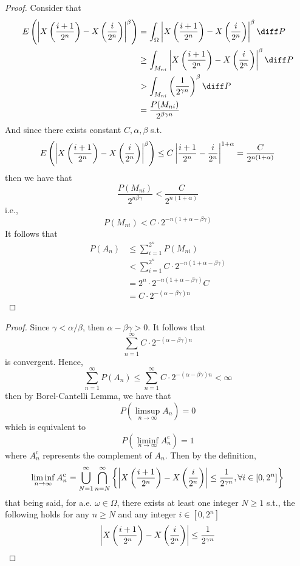 \begin{subproblem}
\begin{proof}
            Consider that
            \[\begin{aligned}
                E\left(\absdelta^\beta\right)&=\int_\Omega\absdelta^\beta\diff P\\
                &\geq\int_{M_{ni}}\absdelta^\beta\diff P\\
                &>\int_{M_{ni}}\left(\frac{1}{2^{\gamma n}}\right)^\beta\diff P\\
                &=\frac{P(M_{ni})}{2^{\beta\gamma n}}
            \end{aligned}\]
            And since there exists constant $C,\alpha,\beta$ s.t.
            \[E\left(\left|X\left(\frac{i+1}{2^n}\right)-X\left(\frac{i}{2^n}\right)\right|^\beta\right)
            \leq C\left|\frac{i+1}{2^n}-\frac{i}{2^n}\right|^{1+\alpha}
            =\frac{C}{2^{n(1+\alpha)}}\]
            then we have that
            \[\frac{P(M_{ni})}{2^{n\beta\gamma}}
            <\frac{C}{2^{n(1+\alpha)}}\]
            i.e.,
            \[P(M_{ni})<C\cdot 2^{-n(1+\alpha-\beta\gamma)}\]
            It follows that
            \[\begin{aligned}
                P(A_n)&\leq\sum_{i=1}^{2^n}P(M_{ni})\\
                &<\sum_{i=1}^{2^n}C\cdot 2^{-n(1+\alpha-\beta\gamma)}\\
                &=2^n\cdot 2^{-n(1+\alpha-\beta\gamma)}C\\
                &=C\cdot 2^{-(\alpha-\beta\gamma)n}
            \end{aligned}\]
        \end{proof}

        \item
        \begin{proof}
            Since $\gamma<\alpha/\beta$, then $\alpha-\beta\gamma>0$.
            It follows that
            \[\sum_{n=1}^\infty C\cdot 2^{-(\alpha-\beta\gamma)n}\]
            is convergent. Hence,
            \[\sum_{n=1}^\infty P(A_n)
            \leq\sum_{n=1}^\infty C\cdot 2^{-(\alpha-\beta\gamma)n}
            <\infty\]
            then by Borel-Cantelli Lemma, we have that
            \[P\left(\limsup_{n\to\infty}A_n\right)=0\]
            which is equivalent to
            \[P\left(\liminf_{n\to\infty}A_n^\mathrm c\right)=1\]
            where $A_n^\mathrm c$ represents the complement of $A_n$.
            Then by the definition,
            \[\liminf_{n\to\infty}A_n^\mathrm c
            =\bigcup_{N=1}^\infty\bigcap_{n=N}^\infty
            \left\{\left|X\left(\frac{i+1}{2^n}\right)-X\left(\frac{i}{2^n}\right)\right|\leq\frac{1}{2^{\gamma n}}
            ,\forall i\in[0,2^n]\right\}\]
            that being said, for a.e. $\omega\in\Omega$,
            there exists at least one integer $N\geq 1$ s.t.,
            the following holds for any $n\geq N$ and any integer
            $i\in [0,2^n]$
            \[\left|X\left(\frac{i+1}{2^n}\right)-X\left(\frac{i}{2^n}\right)\right|\leq\frac{1}{2^{\gamma n}}\]
        \end{proof}
    \end{subproblem}

